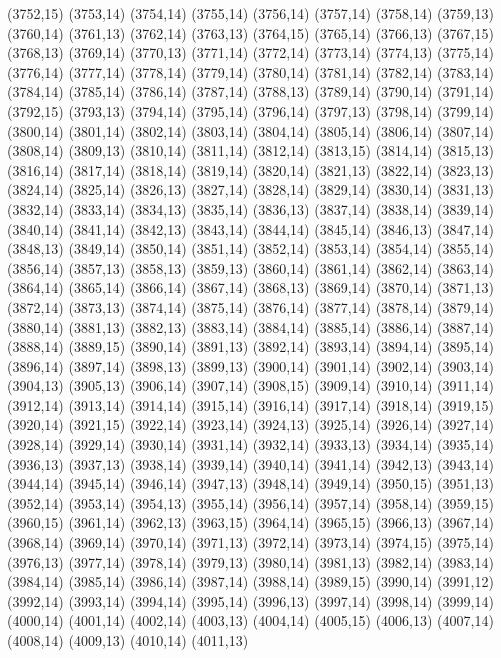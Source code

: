 (3752,15)
(3753,14)
(3754,14)
(3755,14)
(3756,14)
(3757,14)
(3758,14)
(3759,13)
(3760,14)
(3761,13)
(3762,14)
(3763,13)
(3764,15)
(3765,14)
(3766,13)
(3767,15)
(3768,13)
(3769,14)
(3770,13)
(3771,14)
(3772,14)
(3773,14)
(3774,13)
(3775,14)
(3776,14)
(3777,14)
(3778,14)
(3779,14)
(3780,14)
(3781,14)
(3782,14)
(3783,14)
(3784,14)
(3785,14)
(3786,14)
(3787,14)
(3788,13)
(3789,14)
(3790,14)
(3791,14)
(3792,15)
(3793,13)
(3794,14)
(3795,14)
(3796,14)
(3797,13)
(3798,14)
(3799,14)
(3800,14)
(3801,14)
(3802,14)
(3803,14)
(3804,14)
(3805,14)
(3806,14)
(3807,14)
(3808,14)
(3809,13)
(3810,14)
(3811,14)
(3812,14)
(3813,15)
(3814,14)
(3815,13)
(3816,14)
(3817,14)
(3818,14)
(3819,14)
(3820,14)
(3821,13)
(3822,14)
(3823,13)
(3824,14)
(3825,14)
(3826,13)
(3827,14)
(3828,14)
(3829,14)
(3830,14)
(3831,13)
(3832,14)
(3833,14)
(3834,13)
(3835,14)
(3836,13)
(3837,14)
(3838,14)
(3839,14)
(3840,14)
(3841,14)
(3842,13)
(3843,14)
(3844,14)
(3845,14)
(3846,13)
(3847,14)
(3848,13)
(3849,14)
(3850,14)
(3851,14)
(3852,14)
(3853,14)
(3854,14)
(3855,14)
(3856,14)
(3857,13)
(3858,13)
(3859,13)
(3860,14)
(3861,14)
(3862,14)
(3863,14)
(3864,14)
(3865,14)
(3866,14)
(3867,14)
(3868,13)
(3869,14)
(3870,14)
(3871,13)
(3872,14)
(3873,13)
(3874,14)
(3875,14)
(3876,14)
(3877,14)
(3878,14)
(3879,14)
(3880,14)
(3881,13)
(3882,13)
(3883,14)
(3884,14)
(3885,14)
(3886,14)
(3887,14)
(3888,14)
(3889,15)
(3890,14)
(3891,13)
(3892,14)
(3893,14)
(3894,14)
(3895,14)
(3896,14)
(3897,14)
(3898,13)
(3899,13)
(3900,14)
(3901,14)
(3902,14)
(3903,14)
(3904,13)
(3905,13)
(3906,14)
(3907,14)
(3908,15)
(3909,14)
(3910,14)
(3911,14)
(3912,14)
(3913,14)
(3914,14)
(3915,14)
(3916,14)
(3917,14)
(3918,14)
(3919,15)
(3920,14)
(3921,15)
(3922,14)
(3923,14)
(3924,13)
(3925,14)
(3926,14)
(3927,14)
(3928,14)
(3929,14)
(3930,14)
(3931,14)
(3932,14)
(3933,13)
(3934,14)
(3935,14)
(3936,13)
(3937,13)
(3938,14)
(3939,14)
(3940,14)
(3941,14)
(3942,13)
(3943,14)
(3944,14)
(3945,14)
(3946,14)
(3947,13)
(3948,14)
(3949,14)
(3950,15)
(3951,13)
(3952,14)
(3953,14)
(3954,13)
(3955,14)
(3956,14)
(3957,14)
(3958,14)
(3959,15)
(3960,15)
(3961,14)
(3962,13)
(3963,15)
(3964,14)
(3965,15)
(3966,13)
(3967,14)
(3968,14)
(3969,14)
(3970,14)
(3971,13)
(3972,14)
(3973,14)
(3974,15)
(3975,14)
(3976,13)
(3977,14)
(3978,14)
(3979,13)
(3980,14)
(3981,13)
(3982,14)
(3983,14)
(3984,14)
(3985,14)
(3986,14)
(3987,14)
(3988,14)
(3989,15)
(3990,14)
(3991,12)
(3992,14)
(3993,14)
(3994,14)
(3995,14)
(3996,13)
(3997,14)
(3998,14)
(3999,14)
(4000,14)
(4001,14)
(4002,14)
(4003,13)
(4004,14)
(4005,15)
(4006,13)
(4007,14)
(4008,14)
(4009,13)
(4010,14)
(4011,13)
